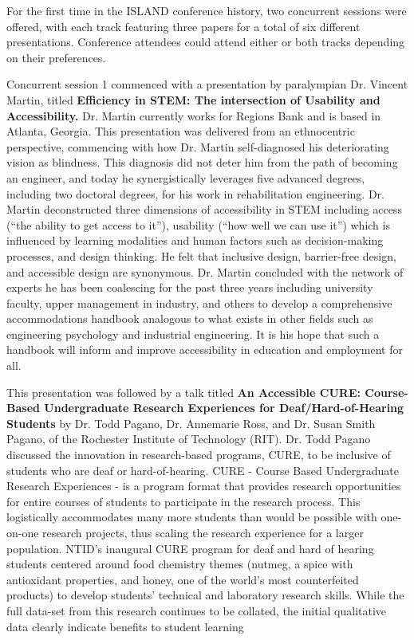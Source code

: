 \documentclass[11.5pt]{sig-alternate}
\begin{document}
\begin{large}
For the first time in the ISLAND conference history, two concurrent sessions were offered, with each track featuring three papers for a total of six different presentations. Conference attendees could attend either or both tracks depending on their preferences. 

Concurrent session 1 commenced with a presentation by paralympian Dr. Vincent Martin, titled \textbf{Efficiency in STEM: The intersection of Usability and Accessibility.} Dr. Martin currently works for Regions Bank and is based in Atlanta, Georgia. This presentation was delivered from an ethnocentric perspective, commencing with how Dr. Martin self-diagnosed his deteriorating vision as blindness. This diagnosis did not deter him from the path of becoming an engineer, and today he synergistically leverages five advanced degrees, including two doctoral degrees, for his work in rehabilitation engineering. Dr. Martin deconstructed three dimensions of accessibility in STEM including access (“the ability to get access to it”), usability (“how well we can use it”) which is influenced by learning modalities and human factors such as decision-making processes, and design thinking. He felt that inclusive design, barrier-free design, and accessible design are synonymous. Dr. Martin concluded with the network of experts he has been coalescing for the past three years including university faculty, upper management in industry, and others to develop a comprehensive accommodations handbook analogous to what exists in other fields such as engineering psychology and industrial engineering. It is his hope that such a handbook will inform and improve accessibility in education and employment for all. 

This presentation was followed by a talk titled \textbf{An Accessible CURE: Course- Based Undergraduate Research Experiences for Deaf/Hard-of-Hearing Students} by Dr. Todd Pagano, Dr. Annemarie Ross, and Dr. Susan Smith Pagano, of the Rochester Institute of Technology (RIT). Dr. Todd Pagano discussed the innovation in research-based programs, CURE, to be inclusive of students who are deaf or hard-of-hearing. CURE - Course Based Undergraduate Research Experiences - is a program format that provides research opportunities for entire courses of students to participate in the research process. This logistically accommodates many more students than would be possible with one-on-one research projects, thus scaling the research experience for a larger population. NTID’s inaugural CURE program for deaf and hard of hearing students centered around food chemistry themes (nutmeg, a spice with antioxidant properties, and honey, one of the world’s most counterfeited products) to develop students’ technical and laboratory research skills. While the full data-set from this research continues to be collated, the initial qualitative data clearly indicate benefits to student learning 


\end{large}
\end{document}
